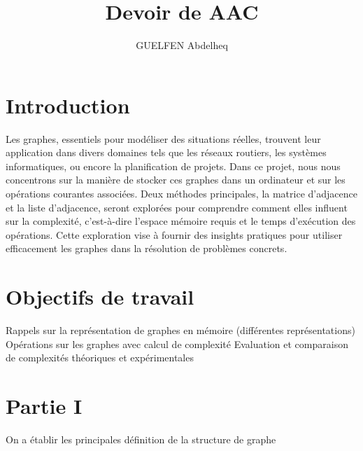 \documentclass{report}
\author{GUELFEN Abdelheq}
\title{Devoir de AAC}
\begin{document}

\clearpage

\tableofcontents
\newpage

\section{Introduction}
Les graphes, essentiels pour modéliser des situations réelles, trouvent leur application dans divers domaines tels que les réseaux routiers, les systèmes informatiques, ou encore la planification de projets. Dans ce projet, nous nous concentrons sur la manière de stocker ces graphes dans un ordinateur et sur les opérations courantes associées. Deux méthodes principales, la matrice d'adjacence et la liste d'adjacence, seront explorées pour comprendre comment elles influent sur la complexité, c'est-à-dire l'espace mémoire requis et le temps d'exécution des opérations. Cette exploration vise à fournir des insights pratiques pour utiliser efficacement les graphes dans la résolution de problèmes concrets.

\section{Objectifs de travail}
Rappels sur la représentation de graphes en mémoire (différentes représentations)
Opérations sur les graphes avec calcul de complexité
Evaluation et comparaison de complexités théoriques et expérimentales

\section{Partie I}
On a établir les principales définition de la structure de graphe
\end{document}
